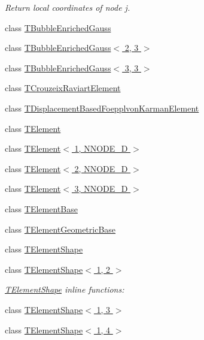 \begin{DoxyCompactItemize}
\begin{DoxyCompactList}\small\item\em Return local coordinates of node j. \end{DoxyCompactList}\item 
class \hyperlink{classoomph_1_1TBubbleEnrichedGauss}{T\+Bubble\+Enriched\+Gauss}
\item 
class \hyperlink{classoomph_1_1TBubbleEnrichedGauss_3_012_00_013_01_4}{T\+Bubble\+Enriched\+Gauss$<$ 2, 3 $>$}
\item 
class \hyperlink{classoomph_1_1TBubbleEnrichedGauss_3_013_00_013_01_4}{T\+Bubble\+Enriched\+Gauss$<$ 3, 3 $>$}
\item 
class \hyperlink{classoomph_1_1TCrouzeixRaviartElement}{T\+Crouzeix\+Raviart\+Element}
\item 
class \hyperlink{classoomph_1_1TDisplacementBasedFoepplvonKarmanElement}{T\+Displacement\+Based\+Foepplvon\+Karman\+Element}
\item 
class \hyperlink{classoomph_1_1TElement}{T\+Element}
\item 
class \hyperlink{classoomph_1_1TElement_3_011_00_01NNODE__1D_01_4}{T\+Element$<$ 1, N\+N\+O\+D\+E\+\_\+D $>$}
\item 
class \hyperlink{classoomph_1_1TElement_3_012_00_01NNODE__1D_01_4}{T\+Element$<$ 2, N\+N\+O\+D\+E\+\_\+D $>$}
\item 
class \hyperlink{classoomph_1_1TElement_3_013_00_01NNODE__1D_01_4}{T\+Element$<$ 3, N\+N\+O\+D\+E\+\_\+D $>$}
\item 
class \hyperlink{classoomph_1_1TElementBase}{T\+Element\+Base}
\item 
class \hyperlink{classoomph_1_1TElementGeometricBase}{T\+Element\+Geometric\+Base}
\item 
class \hyperlink{classoomph_1_1TElementShape}{T\+Element\+Shape}
\item 
class \hyperlink{classoomph_1_1TElementShape_3_011_00_012_01_4}{T\+Element\+Shape$<$ 1, 2 $>$}
\begin{DoxyCompactList}\small\item\em \hyperlink{classoomph_1_1TElementShape}{T\+Element\+Shape} inline functions\+: \end{DoxyCompactList}\item 
class \hyperlink{classoomph_1_1TElementShape_3_011_00_013_01_4}{T\+Element\+Shape$<$ 1, 3 $>$}
\item 
class \hyperlink{classoomph_1_1TElementShape_3_011_00_014_01_4}{T\+Element\+Shape$<$ 1, 4 $>$}
\item 

\end{DoxyCompactItemize}
